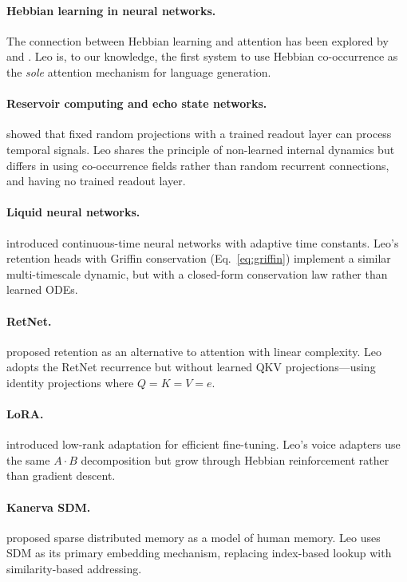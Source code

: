 \documentclass[11pt,twocolumn]{article}
\begin{document}
\paragraph{Hebbian learning in neural networks.} The connection between Hebbian learning and attention has been explored by \citet{whittington2024hebbian} and \citet{miconi2018differentiable}. Leo is, to our knowledge, the first system to use Hebbian co-occurrence as the \textit{sole} attention mechanism for language generation.

\paragraph{Reservoir computing and echo state networks.} \citet{jaeger2001echo} showed that fixed random projections with a trained readout layer can process temporal signals. Leo shares the principle of non-learned internal dynamics but differs in using co-occurrence fields rather than random recurrent connections, and having no trained readout layer.

\paragraph{Liquid neural networks.} \citet{hasani2021liquid} introduced continuous-time neural networks with adaptive time constants. Leo's retention heads with Griffin conservation (Eq.~\ref{eq:griffin}) implement a similar multi-timescale dynamic, but with a closed-form conservation law rather than learned ODEs.

\paragraph{RetNet.} \citet{sun2023retentive} proposed retention as an alternative to attention with linear complexity. Leo adopts the RetNet recurrence but without learned QKV projections---using identity projections where $Q = K = V = e$.

\paragraph{LoRA.} \citet{hu2022lora} introduced low-rank adaptation for efficient fine-tuning. Leo's voice adapters use the same $A \cdot B$ decomposition but grow through Hebbian reinforcement rather than gradient descent.

\paragraph{Kanerva SDM.} \citet{kanerva1988sparse} proposed sparse distributed memory as a model of human memory. Leo uses SDM as its primary embedding mechanism, replacing index-based lookup with similarity-based addressing.
\end{document}
